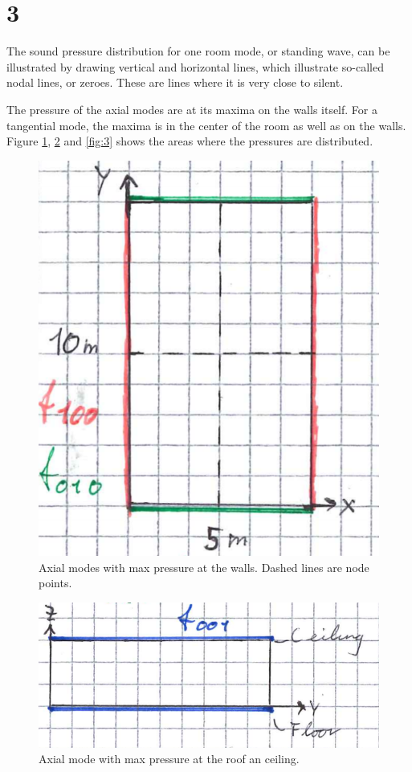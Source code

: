 \documentclass{article}
\begin{document}
\section*{3}
The sound pressure distribution for one room mode, or standing wave, can be illustrated by drawing vertical and horizontal lines, which illustrate so-called nodal lines, or zeroes. These are lines where it is very close to silent. 

The pressure of the axial modes are at its maxima on the walls itself. For a tangential mode, the maxima is in the center of the room as well as on the walls. Figure \ref{fig:1}, \ref{fig:2} and \ref{fig:3} shows the areas where the pressures are distributed.
\begin{figure}[H]
    \centering
    \includegraphics{figures/oving2_3_solution.png}
    \caption{Axial modes with max pressure at the walls. Dashed lines are node points.}
    \label{fig:1}
\end{figure}

\begin{figure}[H]
    \centering
    \includegraphics{figures/oving2_4_solution.png}
    \caption{Axial mode with max pressure at the roof an ceiling.}
    \label{fig:2}
\end{figure}
\end{document}
